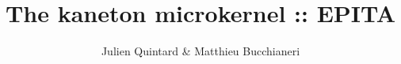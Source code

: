 %
%
%
%
%
%

%
%

\def\path{../..}

%
%

%
%



%
%


%
%

\title{The kaneton microkernel :: EPITA}

%
%

\author{\small{Julien Quintard \& Matthieu Bucchianeri}}

%
%



%
%

\maketitle

%
%

